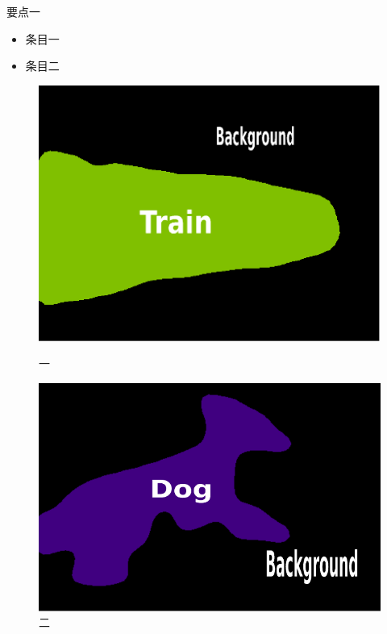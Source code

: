 \documentclass[
    fontset=fandol,
    xcolor=svgnames %
]{ctexbeamer}
\begin{document}
\begin{frame}

    \begin{block}{要点一}
        \begin{itemize}
            \item 条目一
            \item 条目二
        \end{itemize}
    \end{block}

    \begin{figure}
        \begin{minipage}{0.49\textwidth}
            \includegraphics[height=0.45\textheight]{../image/chap04/example/2007_004483.pdf}
            \caption{一}
        \end{minipage}
        \begin{minipage}{0.49\textwidth}
            \includegraphics[height=0.45\textheight]{../image/chap04/example/2007_003194.pdf}
            \caption{二}
        \end{minipage}
    \end{figure}

\end{frame}
\end{document}
